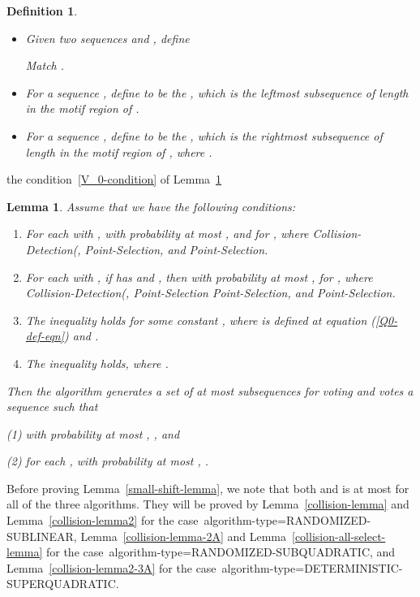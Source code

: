 \documentclass[11pt]{article}
\newtheorem{lemmafoo}[theoremfoo]{Lemma}
\newenvironment{lemma}{\pagebreak[1]\begin{lemmafoo}}{\end{lemmafoo}}
\newtheorem{dfntn}[theoremfoo]{Definition}
\newenvironment{definition}{\pagebreak[1]\begin{dfntn}\rm}{\end{dfntn}}
\newcommand{\scrod}{\quad\nopagebreak}
\newcommand{\algtype}{{\rm algorithm-type}}
\newcommand{\sublinear}{{\rm RANDOMIZED-SUBLINEAR}}
\newcommand{\randomized}{{\rm RANDOMIZED-SUBQUADRATIC}}
\newcommand{\deterministic}{{\rm DETERMINISTIC-SUPERQUADRATIC}}
\begin{document}
\begin{definition}\scrod
\begin{itemize}
\item
 Given two sequences  and , define

Match .
\item
For a  sequence , define  to be
the , which is the leftmost subsequence of
length  in the motif region of .
\item
For a  sequence , define   to be
the , which is the rightmost subsequence
of length  in the motif region of , where
.
\end{itemize}
\end{definition}

the condition~\ref{V_0-condition} of Lemma~\ref{general-lemma}

\begin{lemma}\label{general-lemma}
Assume that we have the following conditions:
\begin{enumerate}
\item\label{varsigma1-condition}
For each  with , with probability at most
,  and
 for , where
Collision-Detection(, Point-Selection, and
Point-Selection.

\item\label{varsigma2-condition}
For each  with , if  has
 and
, then
 with probability at most
,  for , where Collision-Detection(,
Point-Selection
Point-Selection, and
Point-Selection.

\item\label{P0-Q0-condition}
The inequality  holds for some constant ,
where  is defined at equation (\ref{Q0-def-eqn}) and
.

\item\label{V_0-condition} The inequality
 holds, where
.
\end{enumerate}

Then the algorithm generates a set of at most  subsequences for
voting and votes a sequence  such that

(1) with probability at most ,
, and

(2) for each , with probability at most
, .
\end{lemma}

Before proving Lemma~\ref{small-shift-lemma}, we note that both
 and  is at most 
for all of the three algorithms. They will be proved by
Lemma~\ref{collision-lemma} and Lemma~\ref{collision-lemma2} for the
case~\algtype=\sublinear, Lemma~\ref{collision-lemma-2A} and
Lemma~\ref{collision-all-select-lemma} for the
case~\algtype=\randomized, and Lemma~\ref{collision-lemma2-3A} for
the case~\algtype=\deterministic.
\end{document}
